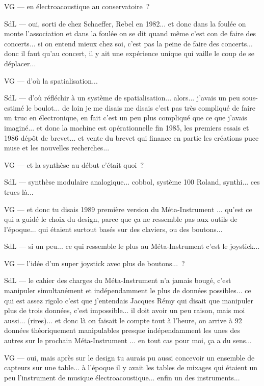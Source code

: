 VG — en électroacoustique au conservatoire ? 

SdL — oui, sorti de chez Schaeffer, Rebel en 1982... et donc dans la foulée on monte l'association et dans la foulée on se dit quand même c'est con de faire des concerts... si on entend mieux chez soi, c'est pas la peine de faire des concerts... donc il faut qu'au concert, il y ait une expérience unique qui vaille le coup de se déplacer... 

VG — d'où la spatialisation... 

SdL — d'où réfléchir à un système de spatialisation... alors... j'avais un peu sous-estimé le boulot... de loin je me disais me disais c'est pas très compliqué de faire un truc en électronique, en fait c'est un peu plus compliqué que ce que j'avais imaginé... et donc la machine est opérationnelle fin 1985, les premiers essais et 1986 dépôt de brevet... et vente du brevet qui finance en partie les créations puce muse et les nouvelles recherches... 

VG — et la synthèse au début c'était quoi ? 

SdL — synthèse modulaire analogique... cobbol, système 100 Roland, synthi... ces trucs là... 

VG — et donc tu disais 1989 première version du Méta-Instrument ... qu'est ce qui a guidé le choix du design, parce que ça ne ressemble pas aux outils de l'époque... qui étaient surtout basés sur des claviers, ou des boutons... 

SdL — si un peu... ce qui ressemble le plus au Méta-Instrument c'est le joystick... 

VG — l'idée d'un super joystick avec plus de boutons... ? 

SdL — le cahier des charges du Méta-Instrument n'a jamais bougé, c'est manipuler simultanément et indépendamment le plus de données possibles... ce qui est assez rigolo c'est que j'entendais Jacques Rémy qui disait que manipuler plus de trois données, c'est impossible... il doit avoir un peu raison, mais moi aussi... (rires)... et donc là on faisait le compte tout à l'heure, on arrive à 92 données théoriquement manipulables presque indépendamment les unes des autres sur le prochain Méta-Instrument ... en tout cas pour moi, ça a du sens... 

VG — oui, mais après sur le design tu aurais pu aussi concevoir un ensemble de capteurs sur une table... à l'époque il y avait les tables de mixages qui étaient un peu l'instrument de musique électroacoustique... enfin un des instruments... 

